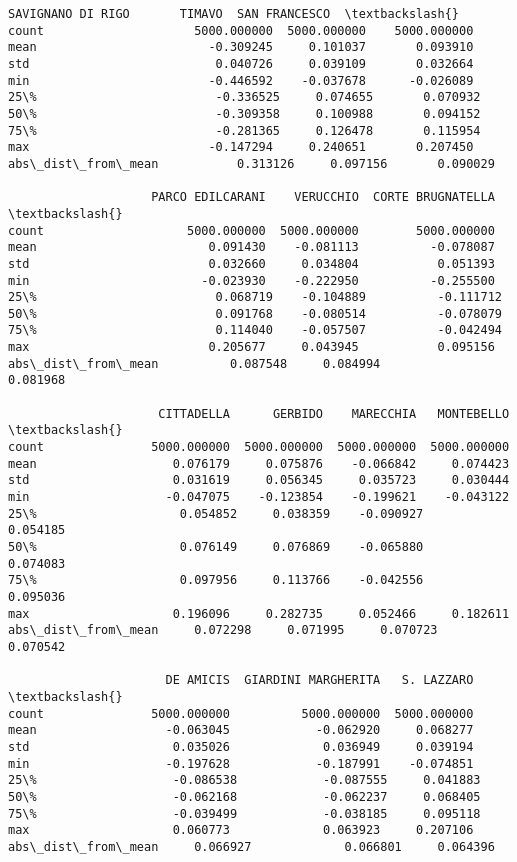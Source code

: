 \documentclass[11pt]{article}
\makeatletter
\newcommand{\boxspacing}{\kern\kvtcb@left@rule\kern\kvtcb@boxsep}
\newcommand{\prompt}[4]{
        {\ttfamily\llap{{\color{#2}[#3]:\hspace{3pt}#4}}\vspace{-\baselineskip}}
    }
\makeatother
\begin{document}
            \begin{tcolorbox}[breakable, size=fbox, boxrule=.5pt, pad at break*=1mm, opacityfill=0]
\prompt{Out}{outcolor}{18}{\boxspacing}
\begin{Verbatim}[commandchars=\\\{\}]
                    SAVIGNANO DI RIGO       TIMAVO  SAN FRANCESCO  \textbackslash{}
count                     5000.000000  5000.000000    5000.000000
mean                        -0.309245     0.101037       0.093910
std                          0.040726     0.039109       0.032664
min                         -0.446592    -0.037678      -0.026089
25\%                         -0.336525     0.074655       0.070932
50\%                         -0.309358     0.100988       0.094152
75\%                         -0.281365     0.126478       0.115954
max                         -0.147294     0.240651       0.207450
abs\_dist\_from\_mean           0.313126     0.097156       0.090029

                    PARCO EDILCARANI    VERUCCHIO  CORTE BRUGNATELLA  \textbackslash{}
count                    5000.000000  5000.000000        5000.000000
mean                        0.091430    -0.081113          -0.078087
std                         0.032660     0.034804           0.051393
min                        -0.023930    -0.222950          -0.255500
25\%                         0.068719    -0.104889          -0.111712
50\%                         0.091768    -0.080514          -0.078079
75\%                         0.114040    -0.057507          -0.042494
max                         0.205677     0.043945           0.095156
abs\_dist\_from\_mean          0.087548     0.084994           0.081968

                     CITTADELLA      GERBIDO    MARECCHIA   MONTEBELLO  \textbackslash{}
count               5000.000000  5000.000000  5000.000000  5000.000000
mean                   0.076179     0.075876    -0.066842     0.074423
std                    0.031619     0.056345     0.035723     0.030444
min                   -0.047075    -0.123854    -0.199621    -0.043122
25\%                    0.054852     0.038359    -0.090927     0.054185
50\%                    0.076149     0.076869    -0.065880     0.074083
75\%                    0.097956     0.113766    -0.042556     0.095036
max                    0.196096     0.282735     0.052466     0.182611
abs\_dist\_from\_mean     0.072298     0.071995     0.070723     0.070542

                      DE AMICIS  GIARDINI MARGHERITA   S. LAZZARO  \textbackslash{}
count               5000.000000          5000.000000  5000.000000
mean                  -0.063045            -0.062920     0.068277
std                    0.035026             0.036949     0.039194
min                   -0.197628            -0.187991    -0.074851
25\%                   -0.086538            -0.087555     0.041883
50\%                   -0.062168            -0.062237     0.068405
75\%                   -0.039499            -0.038185     0.095118
max                    0.060773             0.063923     0.207106
abs\_dist\_from\_mean     0.066927             0.066801     0.064396


\end{Verbatim}
\end{tcolorbox}
\end{document}

